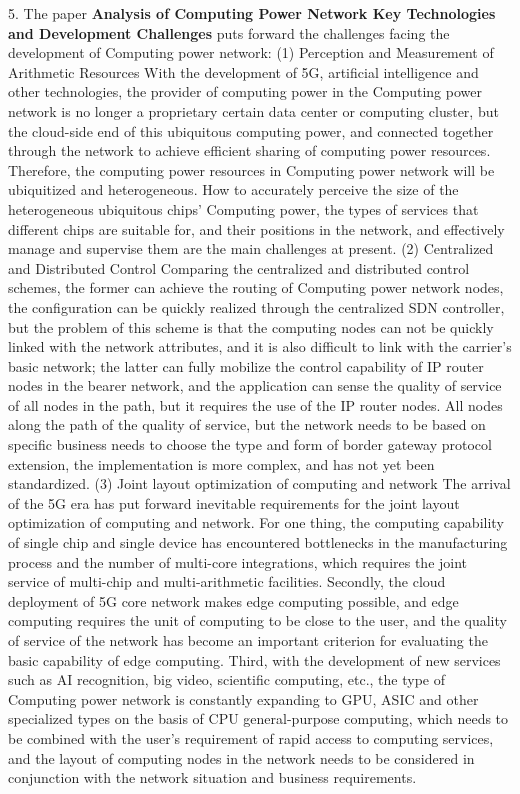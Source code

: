 \documentclass[a4paper,twoside]{scrbook}
\begin{document}
\begin{CJK}{UTF8}{gbsn}
5. The paper \textbf{Analysis of Computing Power Network Key Technologies and Development Challenges}\cite{DXWJ202103002} puts forward the challenges facing the development of Computing power network:
(1) Perception and Measurement of Arithmetic Resources
With the development of 5G, artificial intelligence and other technologies, the provider of computing power in the Computing power network is no longer a proprietary certain data center or computing cluster, but the cloud-side end of this ubiquitous computing power, and connected together through the network to achieve efficient sharing of computing power resources. Therefore, the computing power resources in Computing power network will be ubiquitized and heterogeneous. How to accurately perceive the size of the heterogeneous ubiquitous chips' Computing power, the types of services that different chips are suitable for, and their positions in the network, and effectively manage and supervise them are the main challenges at present.
(2) Centralized and Distributed Control
Comparing the centralized and distributed control schemes, the former can achieve the routing of Computing power network nodes, the configuration can be quickly realized through the centralized SDN controller, but the problem of this scheme is that the computing nodes can not be quickly linked with the network attributes, and it is also difficult to link with the carrier's basic network; the latter can fully mobilize the control capability of IP router nodes in the bearer network, and the application can sense the quality of service of all nodes in the path, but it requires the use of the IP router nodes. All nodes along the path of the quality of service, but the network needs to be based on specific business needs to choose the type and form of border gateway protocol extension, the implementation is more complex, and has not yet been standardized.
(3) Joint layout optimization of computing and network
The arrival of the 5G era has put forward inevitable requirements for the joint layout optimization of computing and network. For one thing, the computing capability of single chip and single device has encountered bottlenecks in the manufacturing process and the number of multi-core integrations, which requires the joint service of multi-chip and multi-arithmetic facilities. Secondly, the cloud deployment of 5G core network makes edge computing possible, and edge computing requires the unit of computing to be close to the user, and the quality of service of the network has become an important criterion for evaluating the basic capability of edge computing. Third, with the development of new services such as AI recognition, big video, scientific computing, etc., the type of Computing power network is constantly expanding to GPU, ASIC and other specialized types on the basis of CPU general-purpose computing, which needs to be combined with the user's requirement of rapid access to computing services, and the layout of computing nodes in the network needs to be considered in conjunction with the network situation and business requirements.



\end{CJK}
\end{document}
